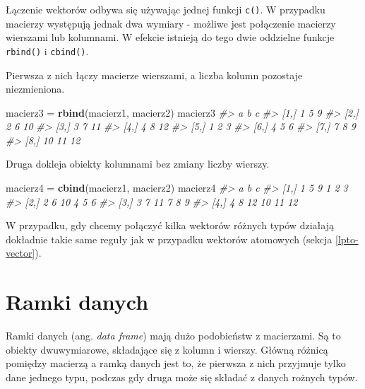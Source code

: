\documentclass[paper=6in:9in,pagesize=pdftex,headinclude=on,footinclude=on,10pt]{scrbook}
\makeatletter
\newenvironment{Shaded}{\begin{snugshade}}{\end{snugshade}}
\newcommand{\CommentTok}[1]{\textcolor[rgb]{0.56,0.35,0.01}{\textit{#1}}}
\newcommand{\KeywordTok}[1]{\textcolor[rgb]{0.13,0.29,0.53}{\textbf{#1}}}
\newcommand{\NormalTok}[1]{#1}
\newcommand{\StringTok}[1]{\textcolor[rgb]{0.31,0.60,0.02}{#1}}
\newenvironment{kframe}{%
\medskip{}
\setlength{\fboxsep}{.8em}
 \def\at@end@of@kframe{}%
 \ifinner\ifhmode%
  \def\at@end@of@kframe{\end{minipage}}%
  \begin{minipage}{\columnwidth}%
 \fi\fi%
 \def\FrameCommand##1{\hskip\@totalleftmargin \hskip-\fboxsep
 \colorbox{shadecolor}{##1}\hskip-\fboxsep
     \hskip-\linewidth \hskip-\@totalleftmargin \hskip\columnwidth}%
 \MakeFramed {\advance\hsize-\width
   \@totalleftmargin\z@ \linewidth\hsize
   \@setminipage}}%
 {\par\unskip\endMakeFramed%
 \at@end@of@kframe}
\newenvironment{rmdblock}[1]
  {
  \begin{itemize}
  \renewcommand{\labelitemi}{
    \raisebox{-.7\height}[0pt][0pt]{
      {\setkeys{Gin}{width=3em,keepaspectratio}\texttt{[image: images/\#1]}}
    }
  }
  \setlength{\fboxsep}{1em}
  \begin{kframe}
  \item
  }
  {
  \end{kframe}
  \end{itemize}
  }
\newenvironment{rmdinfo}
  {\begin{rmdblock}{compass}}
  {\end{rmdblock}}
\makeatother
\begin{document}
Łączenie wektorów odbywa się używając jednej funkcji \texttt{c()}.
W przypadku macierzy występują jednak dwa wymiary - możliwe jest połączenie macierzy wierszami lub kolumnami.
W efekcie istnieją do tego dwie oddzielne funkcje \texttt{rbind()} i \texttt{cbind()}.

Pierwsza z nich łączy macierze wierszami, a liczba kolumn pozostaje niezmieniona.

\begin{Shaded}
\begin{Highlighting}[]
\NormalTok{macierz3 =}\StringTok{ }\KeywordTok{rbind}\NormalTok{(macierz1, macierz2)}
\NormalTok{macierz3}
\CommentTok{#>       a  b  c}
\CommentTok{#> [1,]  1  5  9}
\CommentTok{#> [2,]  2  6 10}
\CommentTok{#> [3,]  3  7 11}
\CommentTok{#> [4,]  4  8 12}
\CommentTok{#> [5,]  1  2  3}
\CommentTok{#> [6,]  4  5  6}
\CommentTok{#> [7,]  7  8  9}
\CommentTok{#> [8,] 10 11 12}
\end{Highlighting}
\end{Shaded}

Druga dokleja obiekty kolumnami bez zmiany liczby wierszy.

\begin{Shaded}
\begin{Highlighting}[]
\NormalTok{macierz4 =}\StringTok{ }\KeywordTok{cbind}\NormalTok{(macierz1, macierz2)}
\NormalTok{macierz4}
\CommentTok{#>              a  b  c}
\CommentTok{#> [1,] 1 5  9  1  2  3}
\CommentTok{#> [2,] 2 6 10  4  5  6}
\CommentTok{#> [3,] 3 7 11  7  8  9}
\CommentTok{#> [4,] 4 8 12 10 11 12}
\end{Highlighting}
\end{Shaded}

\begin{rmdinfo}
\begin{rmdinfo}

W przypadku, gdy chcemy połączyć kilka wektorów różnych typów działają dokładnie takie same reguły jak w przypadku wektorów atomowych (sekcja \ref{lpto-vector}).

\end{rmdinfo}
\end{rmdinfo}

\hypertarget{df}{%
\section{Ramki danych}\label{df}}

Ramki danych (ang. \emph{data frame}) mają dużo podobieństw z macierzami.
Są to obiekty dwuwymiarowe, składające się z kolumn i wierszy.
Główną różnicą pomiędzy macierzą a ramką danych jest to, że pierwsza z nich przyjmuje tylko dane jednego typu, podczas gdy druga może się składać z danych rożnych typów.
\end{document}
